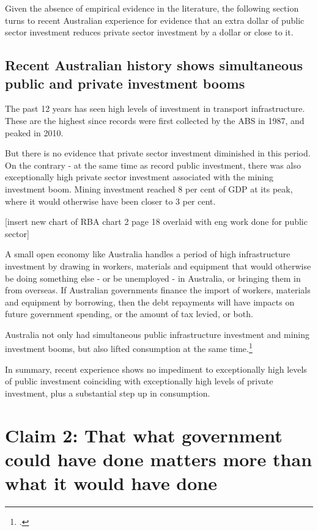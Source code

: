 Given the absence of empirical evidence in the literature, the following section turns to recent Australian experience for evidence that an extra dollar of public sector investment reduces private sector investment by a dollar or close to it. 

\subsection{Recent Australian history shows simultaneous public and private investment booms}

The past 12 years has seen high levels of investment in transport infrastructure. These are the highest since records were first collected by the ABS in 1987, and peaked in 2010. 

But there is no evidence that private sector investment diminished in this period. On the contrary - at the same time as record public investment, there was also exceptionally high private sector investment associated with the mining investment boom. Mining investment reached 8 per cent of GDP at its peak, where it would otherwise have been closer to 3 per cent.

[insert new chart of RBA chart 2 page 18 overlaid with eng work done for public sector]

A small open economy like Australia handles a period of high infrastructure investment by drawing in workers, materials and equipment that would otherwise be doing something else - or be unemployed - in Australia, or bringing them in from overseas. If Australian governments finance the import of workers, materials and equipment by borrowing, then the debt repayments will have impacts on future government spending, or the amount of tax levied, or both.

Australia not only had simultaneous public infrastructure investment and mining investment booms, but also lifted consumption at the same time.\footcite[][20]{RBA-2014-effect-of-mining-boom}  

In summary, recent experience shows no impediment to exceptionally high levels of public investment coinciding with exceptionally high levels of private investment, plus a substantial step up in consumption. 

\section{Claim 2: That what government could have done matters more than what it would have done}

